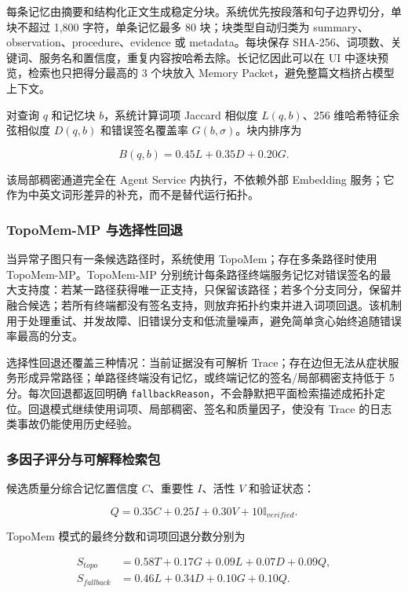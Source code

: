 \documentclass[conference,10pt]{IEEEtran}
\newcommand{\code}[1]{\texttt{#1}}
\begin{document}
每条记忆由摘要和结构化正文生成稳定分块。系统优先按段落和句子边界切分，单块不超过 1,800 字符，单条记忆最多 80 块；块类型自动归类为 summary、observation、procedure、evidence 或 metadata。每块保存 SHA-256、词项数、关键词、服务名和置信度，重复内容按哈希去除。长记忆因此可以在 UI 中逐块预览，检索也只把得分最高的 3 个块放入 Memory Packet，避免整篇文档挤占模型上下文。

对查询 $q$ 和记忆块 $b$，系统计算词项 Jaccard 相似度 $L(q,b)$、256 维哈希特征余弦相似度 $D(q,b)$ 和错误签名覆盖率 $G(b,\sigma)$。块内排序为

\begin{equation}
  B(q,b)=0.45L+0.35D+0.20G.
\end{equation}

该局部稠密通道完全在 Agent Service 内执行，不依赖外部 Embedding 服务；它作为中英文词形差异的补充，而不是替代运行拓扑。

\subsubsection{TopoMem-MP 与选择性回退}

当异常子图只有一条候选路径时，系统使用 TopoMem；存在多条路径时使用 TopoMem-MP。TopoMem-MP 分别统计每条路径终端服务记忆对错误签名的最大支持度：若某一路径获得唯一正支持，只保留该路径；若多个分支同分，保留并融合候选；若所有终端都没有签名支持，则放弃拓扑约束并进入词项回退。该机制用于处理重试、并发故障、旧错误分支和低流量噪声，避免简单贪心始终追随错误率最高的分支。

选择性回退还覆盖三种情况：当前证据没有可解析 Trace；存在边但无法从症状服务形成异常路径；单路径终端没有记忆，或终端记忆的签名/局部稠密支持低于 5 分。每次回退都返回明确 \code{fallbackReason}，不会静默把平面检索描述成拓扑定位。回退模式继续使用词项、局部稠密、签名和质量因子，使没有 Trace 的日志类事故仍能使用历史经验。

\subsubsection{多因子评分与可解释检索包}

候选质量分综合记忆置信度 $C$、重要性 $I$、活性 $V$ 和验证状态：

\begin{equation}
  Q=0.35C+0.25I+0.30V+10\mathbb{I}_{verified}.
\end{equation}

TopoMem 模式的最终分数和词项回退分数分别为

\begin{align}
  S_{topo}&=0.58T+0.17G+0.09L+0.07D+0.09Q,\\
  S_{fallback}&=0.46L+0.34D+0.10G+0.10Q.
\end{align}
\end{document}
